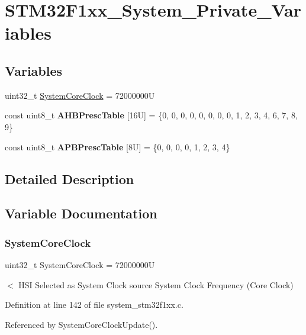 \hypertarget{group__STM32F1xx__System__Private__Variables}{}\section{S\+T\+M32\+F1xx\+\_\+\+System\+\_\+\+Private\+\_\+\+Variables}
\label{group__STM32F1xx__System__Private__Variables}
\subsection*{Variables}
\begin{DoxyCompactItemize}
\item 
uint32\+\_\+t \mbox{\hyperlink{group__STM32F1xx__System__Private__Variables_gaa3cd3e43291e81e795d642b79b6088e6}{System\+Core\+Clock}} = 72000000U
\item 
\mbox{\label{group__STM32F1xx__System__Private__Variables_ga53cb26d01524d9560f98101a2c597c40}} 
const uint8\+\_\+t {\bfseries A\+H\+B\+Presc\+Table} \mbox{[}16\+U\mbox{]} = \{0, 0, 0, 0, 0, 0, 0, 0, 1, 2, 3, 4, 6, 7, 8, 9\}
\item 
\mbox{\label{group__STM32F1xx__System__Private__Variables_gaa93c123312c9273c0928a79f1203f759}} 
const uint8\+\_\+t {\bfseries A\+P\+B\+Presc\+Table} \mbox{[}8\+U\mbox{]} = \{0, 0, 0, 0, 1, 2, 3, 4\}
\end{DoxyCompactItemize}


\subsection{Detailed Description}


\subsection{Variable Documentation}
\mbox{\label{group__STM32F1xx__System__Private__Variables_gaa3cd3e43291e81e795d642b79b6088e6}} 
\subsubsection{\texorpdfstring{System\+Core\+Clock}{SystemCoreClock}}
{\footnotesize\ttfamily uint32\+\_\+t System\+Core\+Clock = 72000000U}

$<$ H\+SI Selected as System Clock source System Clock Frequency (Core Clock) 

Definition at line 142 of file system\+\_\+stm32f1xx.\+c.



Referenced by System\+Core\+Clock\+Update().


